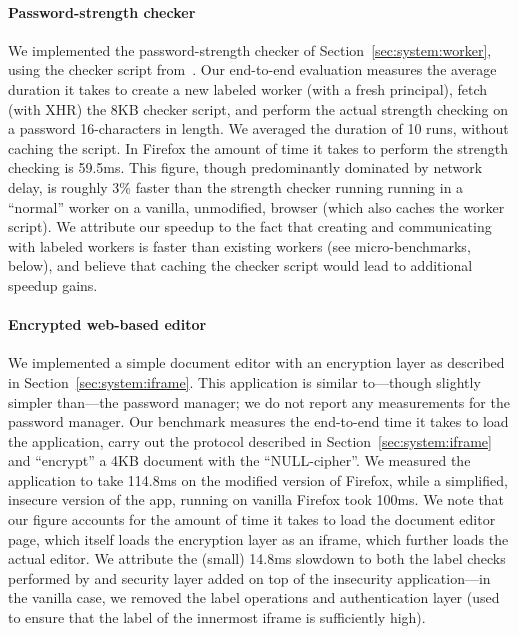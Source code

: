 \paragraph{Password-strength checker}
%
We implemented the password-strength checker of
Section~\ref{sec:system:worker}, using the checker script
from~\cite{checker1}.
%
Our end-to-end evaluation measures the average duration it takes to
create a new labeled worker (with a fresh principal), fetch (with XHR)
the 8KB checker script, and perform the actual strength
checking on a password 16-characters in length.
%
We averaged the duration of 10 runs, without caching the script.
%
In Firefox the amount of time it takes to perform the strength
checking is 59.5ms.
%
This figure, though predominantly dominated by network delay, is
roughly 3\% faster than the strength checker running running in a
``normal'' worker on a vanilla, unmodified, browser (which
also caches the worker script).
%
We attribute our speedup to the fact that creating and communicating
with labeled workers is faster than existing workers (see
micro-benchmarks, below), and believe that caching the checker script
would lead to additional speedup gains.


\paragraph{Encrypted web-based editor}

We implemented a simple document editor with an encryption layer as
described in Section~\ref{sec:system:iframe}.
%
This application is similar to---though slightly simpler than---the
password manager; we do not report any measurements for the
password manager.
%
Our benchmark measures the end-to-end time it takes to load the
application, carry out the protocol described in
Section~\ref{sec:system:iframe}  and ``encrypt'' a 4KB document with
the ``NULL-cipher''.
%
We measured the \sys{} application to take 114.8ms on the modified
version of Firefox, while a simplified, insecure version of the app,
running on vanilla Firefox took 100ms.
%
We note that our figure accounts for the amount of time it takes to
load the document editor page, which itself loads the encryption layer
as an iframe, which further loads the actual editor.
%
We attribute the (small) 14.8ms slowdown to both the label checks
performed by \sys{} and security layer added on top of the insecurity
application---in the vanilla case, we removed the label operations and
authentication layer (used to ensure that the label of the innermost
iframe is sufficiently high).


